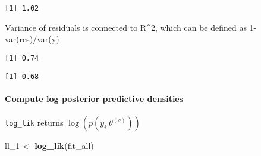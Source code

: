 \documentclass[
]{article}
\newenvironment{Shaded}{\begin{snugshade}}{\end{snugshade}}
\newcommand{\DecValTok}[1]{\textcolor[rgb]{0.00,0.00,0.81}{#1}}
\newcommand{\KeywordTok}[1]{\textcolor[rgb]{0.13,0.29,0.53}{\textbf{#1}}}
\newcommand{\NormalTok}[1]{#1}
\newcommand{\OperatorTok}[1]{\textcolor[rgb]{0.81,0.36,0.00}{\textbf{#1}}}
\newcommand{\StringTok}[1]{\textcolor[rgb]{0.31,0.60,0.02}{#1}}
\begin{document}
\begin{Shaded}
\end{Shaded}

\begin{verbatim}
[1] 1.02
\end{verbatim}

Variance of residuals is connected to R\^{}2, which can be defined as
1-var(res)/var(y)

\begin{Shaded}
\end{Shaded}

\begin{verbatim}
[1] 0.74
\end{verbatim}

\begin{Shaded}
\end{Shaded}

\begin{verbatim}
[1] 0.68
\end{verbatim}

\hypertarget{compute-log-posterior-predictive-densities}{%
\paragraph{Compute log posterior predictive
densities}\label{compute-log-posterior-predictive-densities}}

\texttt{log\_lik} returns \(\log(p(y_i|\theta^{(s)}))\)

\begin{Shaded}
\begin{Highlighting}[]
\NormalTok{ll_}\DecValTok{1}\NormalTok{ <-}\StringTok{ }\KeywordTok{log_lik}\NormalTok{(fit_all)}
\end{Highlighting}
\end{Shaded}
\end{document}
